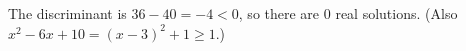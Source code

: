 The discriminant is $36-40=-4<0$, so there are $\boxed{0}$ real solutions. (Also $x^2-6x+10=(x-3)^2+1\ge1$.)
